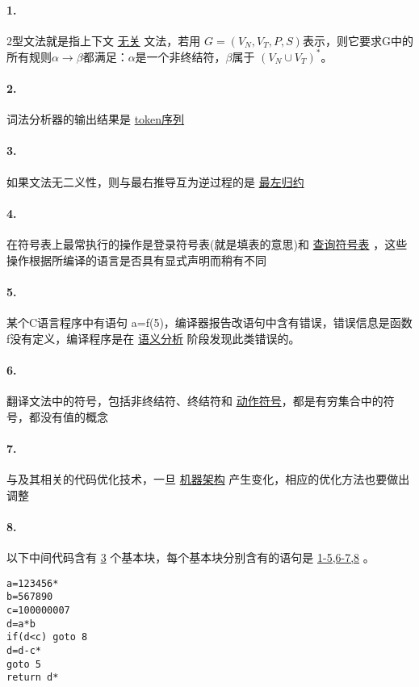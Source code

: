\documentclass[UTF8]{ctexart} %
\begin{document}
\paragraph{1.} 2型文法就是指上下文 \underline{无关} 文法，若用 $G=(V_N,V_T,P,S)$表示，则它要求G中的所有规则$\alpha \rightarrow \beta$都满足：$\alpha$是一个非终结符，$\beta$属于 \underline{$(V_N\cup V_T)^*$}。

\paragraph{2.} 词法分析器的输出结果是 \underline{token序列}

\paragraph{3.} 如果文法无二义性，则与最右推导互为逆过程的是 \underline{最左归约}

\paragraph{4.} 在符号表上最常执行的操作是登录符号表(就是填表的意思)和 \underline{查询符号表} ，这些操作根据所编译的语言是否具有显式声明而稍有不同

\paragraph{5.} 某个C语言程序中有语句 a=f(5)，编译器报告改语句中含有错误，错误信息是函数f没有定义，编译程序是在 \underline{语义分析} 阶段发现此类错误的。

\paragraph{6.} 翻译文法中的符号，包括非终结符、终结符和 \underline{动作符号}，都是有穷集合中的符号，都没有值的概念

\paragraph{7.} 与及其相关的代码优化技术，一旦 \underline{机器架构} 产生变化，相应的优化方法也要做出调整

\paragraph{8.} 以下中间代码含有 \underline{3} 个基本块，每个基本块分别含有的语句是 \underline{1-5,6-7,8} 。

\begin{lstlisting}
a=123456*
b=567890
c=100000007
d=a*b
if(d<c) goto 8
d=d-c*
goto 5
return d*
\end{lstlisting}
\end{document}
